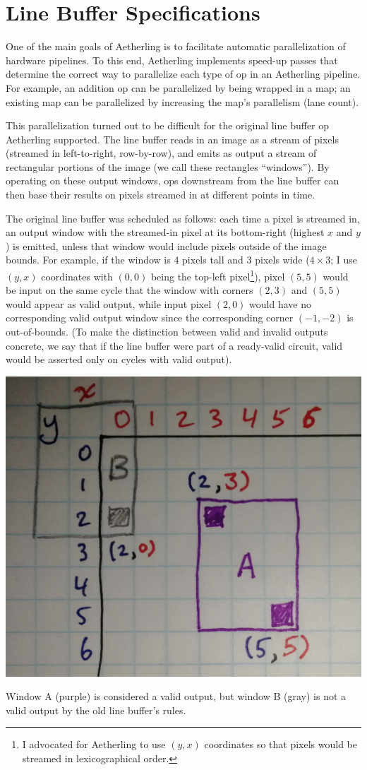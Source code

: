 \documentclass[12pt]{article}
\begin{document}
\section{Line Buffer Specifications}

One of the main goals of Aetherling is to facilitate automatic
parallelization of hardware pipelines. To this end, Aetherling
implements speed-up passes that determine the correct way to
parallelize each type of op in an Aetherling pipeline. For example, an
addition op can be parallelized by being wrapped in a map; an existing
map can be parallelized by increasing the map's parallelism (lane
count).

This parallelization turned out to be difficult for the original line
buffer op Aetherling supported. The line buffer reads in an image as a
stream of pixels (streamed in left-to-right, row-by-row), and emits as
output a stream of rectangular portions of the image (we call these
rectangles ``windows''). By operating on these output windows, ops
downstream from the line buffer can then base their results on pixels
streamed in at different points in time.

The original line buffer was scheduled as follows: each time a pixel
is streamed in, an output window with the streamed-in pixel at its
bottom-right (highest $x$ and $y$) is emitted, unless that window
would include pixels outside of the image bounds. For example, if the
window is 4 pixels tall and 3 pixels wide ($4 \times 3$; I use $(y,x)$
coordinates with $(0,0)$ being the top-left pixel\footnote{I advocated
  for Aetherling to use $(y,x)$ coordinates so that pixels would be
  streamed in lexicographical order.}), pixel $(5,5)$ would be input
on the same cycle that the window with corners $(2,3)$ and $(5,5)$
would appear as valid output, while input pixel $(2,0)$ would have no
corresponding valid output window since the corresponding corner $(-1,
-2)$ is out-of-bounds. (To make the distinction between valid and
invalid outputs concrete, we say that if the line buffer were part
of a ready-valid circuit, valid would be asserted only on cycles
with valid output).

\begin{center}
\includegraphics[width=0.5\linewidth]{Figures/old-line-buffer.jpg}

Window A (purple) is considered a valid output, but window B
(gray) is not a valid output by the old line buffer's rules.
\end{center}
\end{document}

